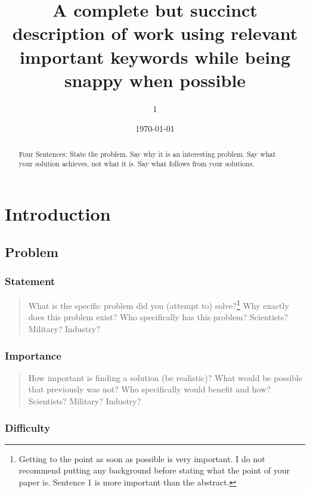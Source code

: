 \documentclass[
  10pt,
  draftcls,
  technote,
  letterpaper,
  oneside,
  onecolumn]{IEEEtran}
\title{A complete but succinct description of work using relevant
important keywords while being snappy when possible}
\author{1\textsuperscript{}}
\date{\today}
\begin{document}
\maketitle
\begin{abstract}
Four Sentences: State the problem. Say why it is an interesting problem.
Say what your solution achieves, not what it is. Say what follows from
your solutions.
\end{abstract}

\hypertarget{introduction}{%
\section{Introduction}\label{introduction}}

\hypertarget{problem}{%
\subsection{Problem}\label{problem}}

\hypertarget{statement}{%
\subsubsection{Statement}\label{statement}}

\begin{quote}
What is the specific problem did you (attempt to) solve?\footnote{Getting
  to the point as soon as possible is very important. I do not recommend
  putting any background before stating what the point of your paper is.
  Sentence 1 is more important than the abstract.} Why exactly does this
problem exist? Who specifically has this problem? Scientists? Military?
Industry?
\end{quote}

\hypertarget{importance}{%
\subsubsection{Importance}\label{importance}}

\begin{quote}
How important is finding a solution (be realistic)? What would be
possible that previously was not? Who specifically would benefit and
how? Scientists? Military? Industry?
\end{quote}

\hypertarget{difficulty}{%
\subsubsection{Difficulty}\label{difficulty}}
\end{document}
